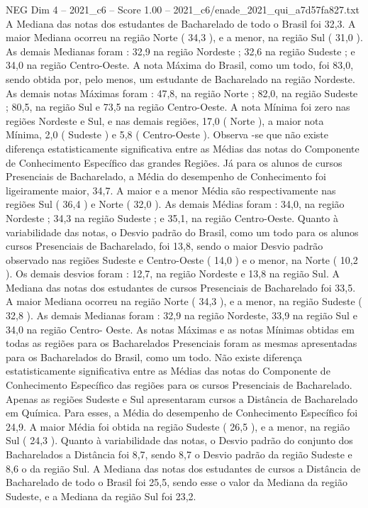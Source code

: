 \begin{textsample}{NEG Dim 4 – 2021\_c6 – Score 1.00 – 2021\_c6/enade\_2021\_qui\_a7d57fa827.txt}
A Mediana das notas dos estudantes de Bacharelado de todo o Brasil foi 32,3.
A maior Mediana ocorreu na região Norte ( 34,3 ), e a menor, na região Sul ( 31,0 ).
As demais Medianas foram : 32,9 na região Nordeste ; 32,6 na região Sudeste ; e 34,0 na região Centro-Oeste.
A nota Máxima do Brasil, como um todo, foi 83,0, sendo obtida por, pelo menos, um estudante de Bacharelado na região Nordeste.
As demais notas Máximas foram : 47,8, na região Norte ; 82,0, na região Sudeste ; 80,5, na região Sul e 73,5 na região Centro-Oeste.
A nota Mínima foi zero nas regiões Nordeste e Sul, e nas demais regiões, 17,0 ( Norte ), a maior nota Mínima, 2,0 ( Sudeste ) e 5,8 ( Centro-Oeste ).
Observa -se que não existe diferença estatisticamente significativa entre as Médias das notas do Componente de Conhecimento Específico das grandes Regiões.
Já para os alunos de cursos Presenciais de Bacharelado, a Média do desempenho de Conhecimento foi ligeiramente maior, 34,7.
A maior e a menor Média são respectivamente nas regiões Sul ( 36,4 ) e Norte ( 32,0 ).
As demais Médias foram : 34,0, na região Nordeste ; 34,3 na região Sudeste ; e 35,1, na região Centro-Oeste.
Quanto à variabilidade das notas, o Desvio padrão do Brasil, como um todo para os alunos cursos Presenciais de Bacharelado, foi 13,8, sendo o maior Desvio padrão observado nas regiões Sudeste e Centro-Oeste ( 14,0 ) e o menor, na Norte ( 10,2 ).
Os demais desvios foram : 12,7, na região Nordeste e 13,8 na região Sul.
A Mediana das notas dos estudantes de cursos Presenciais de Bacharelado foi 33,5.
A maior Mediana ocorreu na região Norte ( 34,3 ), e a menor, na região Sudeste ( 32,8 ).
As demais Medianas foram : 32,9 na região Nordeste, 33,9 na região Sul e 34,0 na região Centro- Oeste.
As notas Máximas e as notas Mínimas obtidas em todas as regiões para os Bacharelados Presenciais foram as mesmas apresentadas para os Bacharelados do Brasil, como um todo.
Não existe diferença estatisticamente significativa entre as Médias das notas do Componente de Conhecimento Específico das regiões para os cursos Presenciais de Bacharelado.
Apenas as regiões Sudeste e Sul apresentaram cursos a Distância de Bacharelado em Química.
Para esses, a Média do desempenho de Conhecimento Específico foi 24,9.
A maior Média foi obtida na região Sudeste ( 26,5 ), e a menor, na região Sul ( 24,3 ).
Quanto à variabilidade das notas, o Desvio padrão do conjunto dos Bacharelados a Distância foi 8,7, sendo 8,7 o Desvio padrão da região Sudeste e 8,6 o da região Sul.
A Mediana das notas dos estudantes de cursos a Distância de Bacharelado de todo o Brasil foi 25,5, sendo esse o valor da Mediana da região Sudeste, e a Mediana da região Sul foi 23,2.

\end{textsample}
